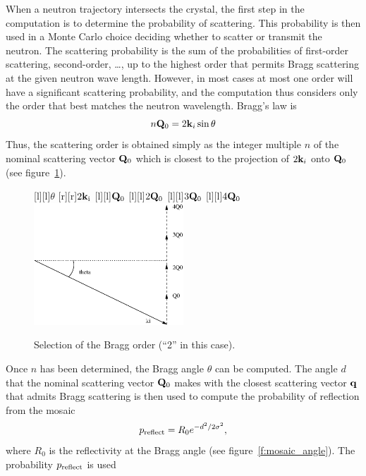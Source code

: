 When a neutron trajectory intersects the crystal, the first step in the
computation is to determine the probability of scattering. This
probability is then used in a Monte Carlo choice deciding whether to
scatter or transmit the neutron. The scattering probability is the sum
of the probabilities of first-order scattering, second-order, \ldots, up
to the highest order that permits Bragg scattering at the given neutron
wave length. However, in most cases at most one order will have a
significant scattering probability, and the computation thus considers
only the order that best matches the neutron wavelength. Bragg's law is
%
$$ n{\bf Q}_0 = 2{\bf k}_i\sin\theta $$
%
Thus, the scattering order is obtained simply as the integer multiple
$n$ of the nominal scattering vector ${\bf Q}_0$ which is closest to the
projection of $2{\bf k}_i$ onto ${\bf Q}_0$ (see
figure~\ref{f:mosaic_order}).
%
%
\begin{figure}
  \begin{center}
    [l][l]{$\theta$}
    [r][r]{$2{\bf k}_{\rm i}$}
    [l][l]{${\bf Q}_0$}
    [l][l]{$2{\bf Q}_0$}
    [l][l]{$3{\bf Q}_0$}
    [l][l]{$4{\bf Q}_0$}
    \includegraphics[width=0.5\textwidth]{figures/mosaic_order.eps}
  \end{center}
\caption{Selection of the Bragg order (``2'' in this case).}
\label{f:mosaic_order}
\end{figure}
%
Once $n$ has been determined, the Bragg angle $\theta$ can be
computed. The angle $d$ that the nominal scattering vector ${\bf Q}_0$
makes with the closest scattering vector ${\bf q}$ that admits Bragg
scattering is then used to compute the probability of reflection from
the mosaic
$$ p_{\rm reflect} = R_0 e^{-d^2/2\sigma^2}, $$
where $R_0$ is the reflectivity at the Bragg angle (see
figure~\ref{f:mosaic_angle}). The probability $p_{\rm reflect}$ is used

